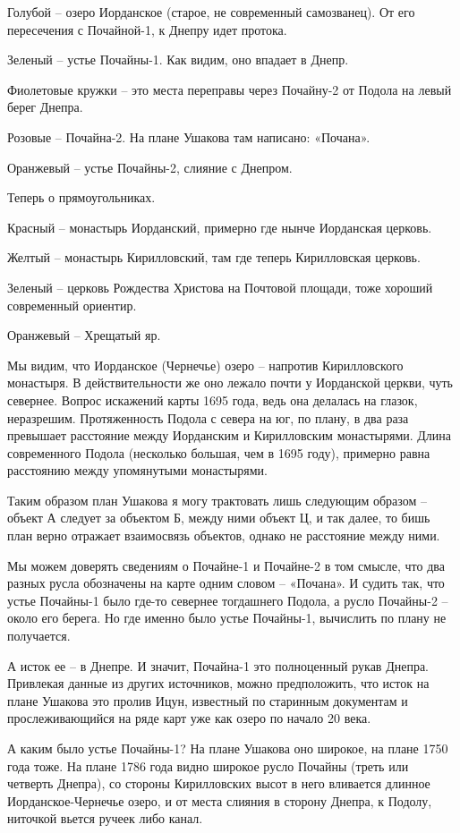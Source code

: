 Голубой – озеро Иорданское (старое, не современный самозванец). От его пересечения с Почайной-1, к Днепру идет протока.

Зеленый – устье Почайны-1. Как видим, оно впадает в Днепр. 

Фиолетовые кружки – это места переправы через Почайну-2 от Подола на левый берег Днепра.

Розовые – Почайна-2. На плане Ушакова там написано: «Почана».

Оранжевый – устье Почайны-2, слияние с Днепром.

Теперь о прямоугольниках.

Красный – монастырь Иорданский, примерно где нынче Иорданская церковь.

Желтый – монастырь Кирилловский, там где теперь Кирилловская церковь.

Зеленый – церковь Рождества Христова на Почтовой площади, тоже хороший современный ориентир.

Оранжевый – Хрещатый яр.

Мы видим, что Иорданское (Чернечье) озеро – напротив Кирилловского монастыря. В действительности же оно лежало почти у Иорданской церкви, чуть севернее. Вопрос искажений карты 1695 года, ведь она делалась на глазок, неразрешим. Протяженность Подола с севера на юг, по плану, в два раза превышает расстояние между Иорданским и Кирилловским монастырями. Длина современного Подола (несколько большая, чем в 1695 году), примерно равна расстоянию между упомянутыми монастырями.

Таким образом план Ушакова я могу трактовать лишь следующим образом – объект А следует за объектом Б, между ними объект Ц, и так далее, то бишь план верно отражает взаимосвязь объектов, однако не расстояние между ними.

Мы можем доверять сведениям о Почайне-1 и Почай\-не-2 в том смысле, что два разных русла обозначены на карте одним словом – «Почана». И судить так, что устье Почайны-1 было где-то севернее тогдашнего Подола, а русло Почайны-2 – около его берега. Но где именно было устье Почайны-1, вычислить по плану не получается.

А исток ее – в Днепре. И значит, Почайна-1 это полноценный рукав Днепра. Привлекая данные из других источников, можно предположить, что исток на плане Ушакова это пролив Ицун, известный по старинным документам и прослеживающийся на ряде карт уже как озеро по начало 20 века.

А каким было устье Почайны-1? На плане Ушакова оно широкое, на плане 1750 года тоже. На плане 1786 года видно широкое русло Почайны (треть или четверть Днепра), со стороны Кирилловских высот в него вливается длинное Иорданское-Чернечье озеро, и от места слияния в сторону Днепра, к Подолу, ниточкой вьется ручеек либо канал.

